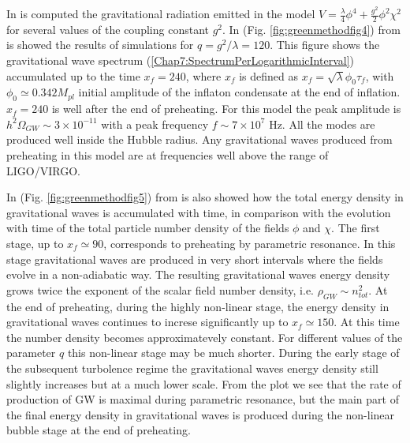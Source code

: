 \documentclass[11pt,a4paper,twoside]{book}
\begin{document}
In \cite{Chap7:GreenMethod} is computed the gravitational radiation emitted in the model $ V=\frac{\lambda}{4}\phi^{4}+\frac{g^{2}}{2}\phi^{2}\chi^{2} $ for several values of the coupling constant $ g^{2} $. In (Fig. \ref{fig:greenmethodfig4}) from \cite{Chap7:GreenMethod} is showed the results of simulations for $ q=g^{2}/\lambda=120 $. This figure shows the gravitational wave spectrum (\ref{Chap7:SpectrumPerLogarithmicInterval}) accumulated up to the time $ x_{f}= 240 $, where $ x_{f} $ is defined as $ x_{f}=\sqrt{\lambda}\phi_{0}\tau_{f} $, with $\phi_{0} \simeq 0.342 M_{pl}$ initial amplitude of the inflaton condensate at the end of inflation. $ x_{f}=240 $ is well after the end of preheating. For this model the peak amplitude is $ h^{2}\Omega_{GW} \sim 3 \times 10^{-11} $ with a peak frequency $ f \sim 7 \times 10^{7} $ Hz. All the modes are produced well inside the Hubble radius. Any gravitational waves produced from preheating in this model are at frequencies well above the range of LIGO/VIRGO.

In (Fig. \ref{fig:greenmethodfig5}) from \cite{Chap7:GreenMethod} is also showed how the total energy density in gravitational waves is accumulated with time, in comparison with the evolution with time of the total particle number density of the fields $\phi$ and $\chi$. The first stage, up to $ x_{f}\simeq 90 $, corresponds  to preheating by parametric resonance. In this stage gravitational waves are produced in very short intervals where the fields evolve in a non-adiabatic way. The resulting gravitational waves energy density grows twice the exponent  of the scalar field number density, i.e. $ \rho_{GW} \sim n_{tot}^{2} $. At the end of preheating, during the highly non-linear stage, the energy density in gravitational waves continues to increse significantly up to $ x_{f}\simeq 150 $. At this time the number density becomes approximatevely constant. For different values of the parameter $ q $ this non-linear stage may be much shorter. During the early stage of the subsequent turbolence regime the gravitational waves energy density still slightly increases but at a much lower scale. From the plot we see that the rate of production of GW is maximal during parametric resonance, but the main part of the final energy density in gravitational waves is produced during the non-linear bubble stage at the end of preheating.
\end{document}
